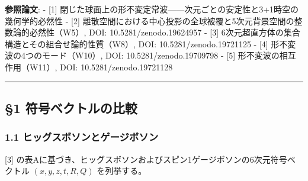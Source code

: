 \documentclass[
  a4paper,11pt]{ltjsarticle}
\theoremstyle{definition}
\theoremstyle{remark}
\begin{document}
\textbf{参照論文}: - {[}1{]}
閉じた球面上の形不変定常波------次元ごとの安定性と3+1時空の幾何学的必然性
- {[}2{]}
離散空間における中心投影の全球被覆と5次元背景空間の整数論的必然性（W5）,
DOI: 10.5281/zenodo.19624957 - {[}3{]}
6次元超直方体の集合構造とその組合せ論的性質（W8）, DOI:
10.5281/zenodo.19721125 - {[}4{]} 形不変波の4つのモード（W10）, DOI:
10.5281/zenodo.19709798 - {[}5{]} 形不変波の相互作用（W11）, DOI:
10.5281/zenodo.19721128

\begin{center}\rule{0.5\linewidth}{0.5pt}\end{center}

\subsection{§1
符号ベクトルの比較}\label{ux7b26ux53f7ux30d9ux30afux30c8ux30ebux306eux6bd4ux8f03}

\subsubsection{1.1
ヒッグスボソンとゲージボソン}\label{ux30d2ux30c3ux30b0ux30b9ux30dcux30bdux30f3ux3068ux30b2ux30fcux30b8ux30dcux30bdux30f3}

{[}3{]}
の表Aに基づき、ヒッグスボソンおよびスピン1ゲージボソンの6次元符号ベクトル
\((x, y, z, t, R, Q)\) を列挙する。
\end{document}

